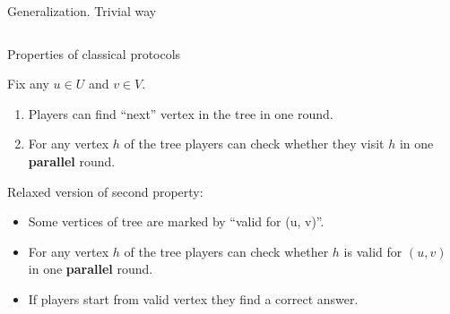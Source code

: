 \begin{frame}{Generalization. Trivial way}

	\pause
    \begin{columns}[t]
		\begin{column}{0.6\textwidth}
            
            \vspace{0.3cm}

        \end{column}
        
		\begin{column}{0.25\textwidth}
            
		\end{column}
	\end{columns}

\end{frame}

\begin{frame}{Properties of classical protocols}

    Fix any $u \in U$ and $v \in V$.

    \pause
    \begin{enumerate}
        \item Players can find ``next'' vertex in the tree in one round.
        \item For any vertex $h$ of the tree players can check whether they visit $h$ in one
            \textbf{parallel} round.
    \end{enumerate}

    \pause
    Relaxed version of second property:
    \begin{itemize}
        \item Some vertices of tree are marked by ``valid for (u, v)''.
        \item For any vertex $h$ of the tree players can check whether $h$ is valid for $(u, v)$ in one
            \textbf{parallel} round.
        \item If players start from valid vertex they find a correct answer.
    \end{itemize}
    
\end{frame}

